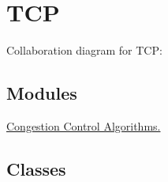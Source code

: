 \hypertarget{group__tcp}{}\section{T\+CP}
\label{group__tcp}
Collaboration diagram for T\+CP\+:
\subsection*{Modules}
\begin{DoxyCompactItemize}
\item 
\hyperlink{group__congestionOps}{Congestion Control Algorithms.}
\end{DoxyCompactItemize}
\subsection*{Classes}
